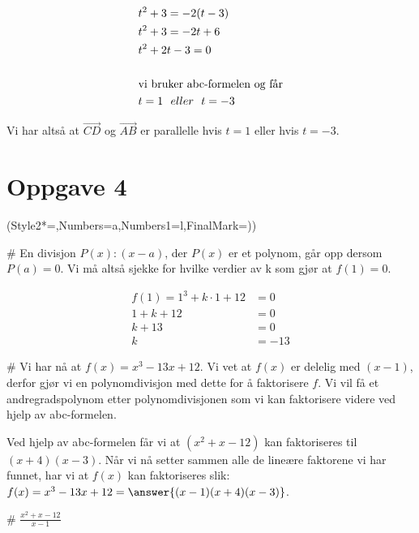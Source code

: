 \begin{easylist}[enumerate]
	\begin{equation*}
		\begin{aligned}
			&t^2 + 3  = -2(t-3)\\
			&t^2 + 3  = -2t + 6\\
			&t^2 +2t -3 = 0   \\ \\
			&\textnormal{vi bruker abc-formelen og får}\\
			&t = 1 \:\:\: eller \:\:\: t=-3
		\end{aligned}
	\end{equation*}
	
	Vi har altså at $\vec{CD}$ og $\vec{AB}$ er parallelle hvis $t = 1$ eller hvis $t = -3$.
	
\end{easylist}

\section*{Oppgave 4}
\begin{easylist}[enumerate]
	\ListProperties(Style2*=,Numbers=a,Numbers1=l,FinalMark={)})
	
	# En divisjon $P(x) : (x-a)$, der $P(x)$ er et polynom, går opp dersom $P(a) = 0$. Vi må altså sjekke for hvilke verdier av k som gjør at $f(1)= 0$.\newline
	
	\begin{equation*}
		\begin{aligned}
		f(1) = 1^3 + k \cdot 1 + 12 &= 0 \\
		1+k+12 & =0 \\
		k + 13 & = 0 \\
		k & = -13 
		\end{aligned}
	\end{equation*}
	
	# Vi har nå at $f(x) = x^3 - 13x + 12$. Vi vet at $f(x)$ er delelig med $(x-1)$, derfor gjør vi en polynomdivisjon med dette for å faktorisere $f$. Vi vil få et andregradspolynom etter polynomdivisjonen som vi kan faktorisere videre ved hjelp av abc-formelen. \newline
	 \\ \newline
	
	Ved hjelp av abc-formelen får vi at $(x^2 + x -12 )$ kan faktoriseres til $(x+4)(x-3)$. Når vi nå setter sammen alle de lineære faktorene vi har funnet, har vi at $f(x)$ kan faktoriseres slik: $f(x) = x^3 - 13x + 12 = \answer{(x-1)(x+4)(x-3)}$.
	
	# $\frac{x^2 + x -12}{x-1}$
	
	
	
	
\end{easylist}
